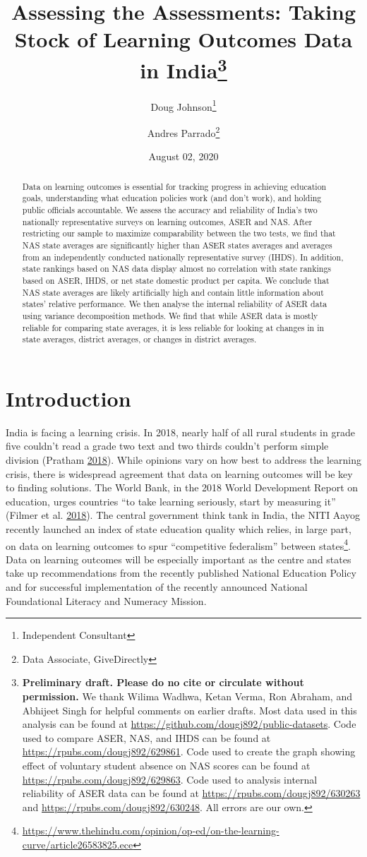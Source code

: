 \documentclass[
  11pt,
]{article}
\title{Assessing the Assessments: Taking Stock of Learning Outcomes Data in India\thanks{\textbf{Preliminary draft. Please do no cite or circulate without permission.} We thank Wilima Wadhwa, Ketan Verma, Ron Abraham, and Abhijeet Singh for helpful comments on earlier drafts. Most data used in this analysis can be found at \url{https://github.com/dougj892/public-datasets}. Code used to compare ASER, NAS, and IHDS can be found at \url{https://rpubs.com/dougj892/629861}. Code used to create the graph showing effect of voluntary student absence on NAS scores can be found at \url{https://rpubs.com/dougj892/629863}. Code used to analysis internal reliability of ASER data can be found at \url{https://rpubs.com/dougj892/630263} and \url{https://rpubs.com/dougj892/630248}. All errors are our own.}}
\author{Doug Johnson\footnote{Independent Consultant} \and Andres Parrado\footnote{Data Associate, GiveDirectly}}
\date{August 02, 2020}
\begin{document}
\maketitle
\begin{abstract}
Data on learning outcomes is essential for tracking progress in achieving education goals, understanding what education policies work (and don't work), and holding public officials accountable. We assess the accuracy and reliability of India's two nationally representative surveys on learning outcomes, ASER and NAS. After restricting our sample to maximize comparability between the two tests, we find that NAS state averages are significantly higher than ASER states averages and averages from an independently conducted nationally representative survey (IHDS). In addition, state rankings based on NAS data display almost no correlation with state rankings based on ASER, IHDS, or net state domestic product per capita. We conclude that NAS state averages are likely artificially high and contain little information about states' relative performance. We then analyse the internal reliability of ASER data using variance decomposition methods. We find that while ASER data is mostly reliable for comparing state averages, it is less reliable for looking at changes in in state averages, district averages, or changes in district averages.
\end{abstract}

\newpage

\hypertarget{introduction}{%
\section{Introduction}\label{introduction}}

India is facing a learning crisis. In 2018, nearly half of all rural students in grade five couldn't read a grade two text and two thirds couldn't perform simple division (Pratham \protect\hyperlink{ref-aser2018}{2018}). While opinions vary on how best to address the learning crisis, there is widespread agreement that data on learning outcomes will be key to finding solutions. The World Bank, in the 2018 World Development Report on education, urges countries ``to take learning seriously, start by measuring it'' (Filmer et al. \protect\hyperlink{ref-filmer2018learning}{2018}). The central government think tank in India, the NITI Aayog recently launched an index of state education quality which relies, in large part, on data on learning outcomes to spur ``competitive federalism'' between states\footnote{\url{https://www.thehindu.com/opinion/op-ed/on-the-learning-curve/article26583825.ece}}. Data on learning outcomes will be especially important as the centre and states take up recommendations from the recently published National Education Policy and for successful implementation of the recently announced National Foundational Literacy and Numeracy Mission.
\end{document}
